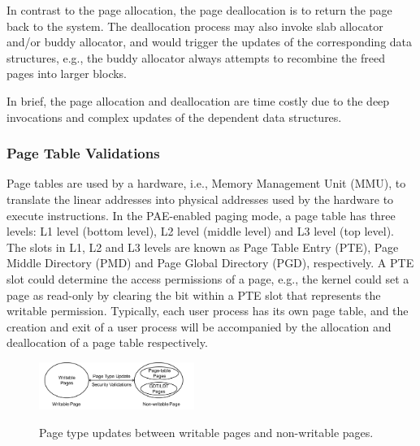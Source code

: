 In contrast to the page allocation, the page deallocation is to return the page back to the system.
The deallocation process may also invoke slab allocator and/or buddy allocator, and would trigger the updates of the corresponding data structures, 
e.g., the buddy allocator always attempts to recombine the freed pages into larger blocks.

In brief, the page allocation and deallocation are time costly due to the deep invocations and complex updates of the dependent data structures.


\subsubsection{Page Table Validations}\label{sec:pv-security}
Page tables are used by a hardware, i.e., Memory Management Unit (MMU), to translate the linear addresses into physical addresses used by the hardware to execute instructions.
In the PAE-enabled paging mode, a page table has three levels: L1 level (bottom level), L2 level (middle level) and L3 level (top level).
The slots in L1, L2 and L3 levels are known as Page Table Entry (PTE), Page Middle Directory (PMD) and Page Global Directory (PGD), respectively.
A PTE slot could determine the access permissions of a page, e.g., the kernel could set a page as read-only by clearing the bit within a PTE slot that represents the writable permission.
Typically, each user process has its own page table, and the creation and exit of a user process will be accompanied by the allocation and deallocation of a page table respectively.
\begin{figure}[ht]
\centering
\includegraphics[width=0.45\textwidth]{image/background/page-type-update.png} \\
\caption{Page type updates between writable pages and non-writable pages. }
\label{fig:page-type-updates}
\end{figure}



